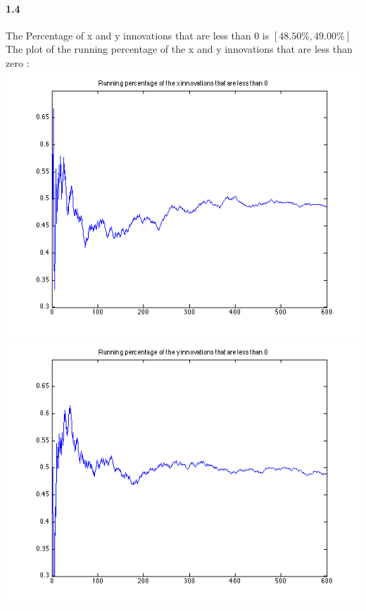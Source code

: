 \documentclass[a4paper]{article}
\begin{document}
\paragraph{1.4 } The Percentage of x and y innovations that are less than 0 is $[ 48.50\%, 49.00\% ]$ \\

The plot of the running percentage of the x and y innovations that are less than zero : \\
\includegraphics[scale=.4]{target_1_x_running.png}
\includegraphics[scale=.4]{target_1_y_running.png} \\
\end{document}
